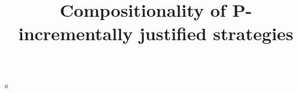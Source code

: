 \documentclass{article}
\title{Compositionality of P-incrementally justified strategies}
\begin{document}
s
\end{document}
